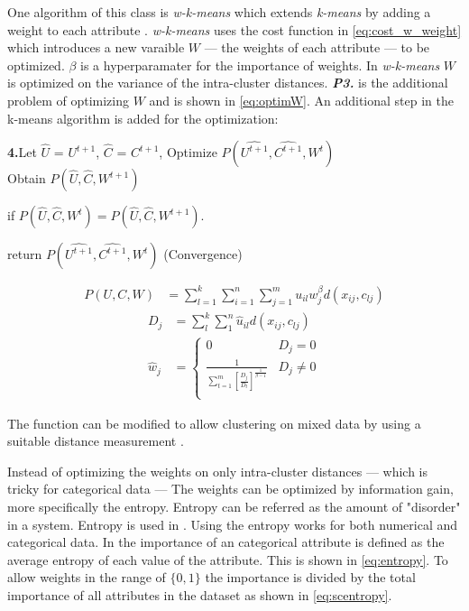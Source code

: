 \documentclass[../report.tex]{subfiles}
\begin{document}
One algorithm of this class is \textit{w-k-means} which extends \textit{k-means} by adding a weight to each attribute \cite{huang2005automated}.
\textit{w-k-means} uses the cost function in \ref{eq:cost_w_weight} which introduces a new varaible $W$ --- the weights of each attribute --- to be optimized. $\beta$ is a hyperparamater for the importance of weights. In \textit{w-k-means} $W$ is optimized on the variance of the intra-cluster distances. \textit\textbf{P3.} is the additional problem of optimizing $W$ and is shown in \ref{eq:optimW}. An additional step in the k-means algorithm is added for the optimization:

\textbf{4.}\quad Let $\hat{U}$ = $U^{t+1}$, $\hat{C}$ = $C^{t+1}$, Optimize $P(\hat{U^{t+1}}, \hat{ C^{t + 1} }, W^{t})$ \\
\quad  Obtain $P(\hat{U}, \hat{ C }, W^{t + 1})$
\begin{description}
  \item if $P(\hat{U}, \hat{ C }, W^{t}) = P(\hat{U}, \hat{ C }, W^{t + 1})$.

  \item \quad return $P(\hat{U^{t+1}}, \hat{ C^{t + 1} }, W^{t})$ (Convergence)
\end{description}

\begin{align}
  \label{eq:cost_w_weight}
  P(U,C,W) &= \sum^k_{l=1} \sum^n_{i=1} \sum^m_{j=1} u_{il} w_j^{\beta} d(x_{ij},c_{lj})
\end{align}
\begin{align}
D_j &= \sum^{ k }_{ l }{\sum^n_1 {\hat{u}_{il} d(x_{ ij }, c_ { lj } )}} \\
\label{eq:optimW}
\hat{w}_j &=
\begin{cases}
  0 & D_j = 0 \\
  \frac{1}{ \sum^m_{t=1} [\frac{ D_j }{ D_t }]^{ \frac{ 1 }{ \beta - 1 } } } & D_j \neq 0 \\
\end{cases}
\end{align}

The function can be modified to allow clustering on mixed data by using a suitable distance measurement \cite{Jia2018}.

Instead of optimizing the weights on only intra-cluster distances --- which is tricky for categorical data --- The weights can be optimized by information gain, more specifically the entropy. Entropy can be referred as the amount of "disorder" in a system. Entropy is used in \cite{Cheung2013, Jing2007}. Using the entropy works for both numerical and categorical data. In \cite{Cheung2013} the importance of an categorical attribute is defined as the average entropy of each value of the attribute. This is shown in \ref{eq:entropy}. To allow weights in the range of $\{0,1\}$ the importance is divided by the total importance of all attributes in the dataset as shown in \ref{eq:scentropy}.
\end{document}
